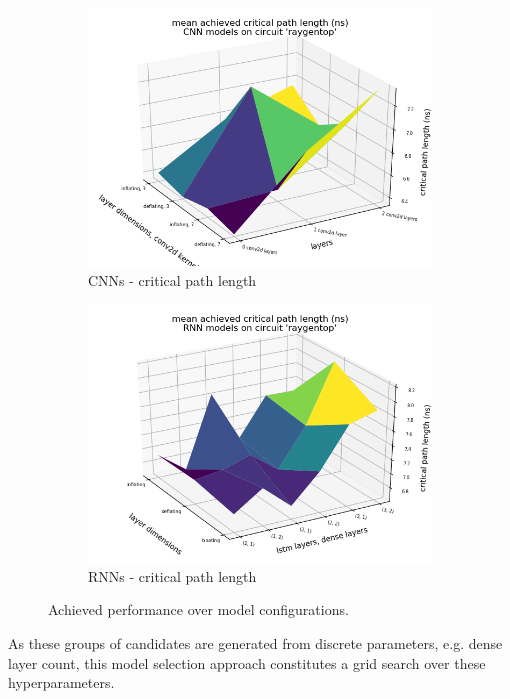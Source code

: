 \begin{figure}
\begin{subfigure}[b]{0.45\linewidth}
		\includegraphics[width=\linewidth]{plots/cnn-hyperopt-critical-path.png}
		\caption{\glspl{CNN} - critical path length}
	\end{subfigure}
	\begin{subfigure}[b]{0.45\linewidth}
		\includegraphics[width=\linewidth]{plots/rnn-hyperopt-critical-path.png}
		\caption{\glspl{RNN} - critical path length}
	\end{subfigure}
	\caption{Achieved performance over model configurations.}
	\label{fig:eval-hyperopt-surface}
\end{figure}

As these groups of candidates are generated from discrete parameters, e.g. dense layer count, this model selection approach constitutes a grid search over these hyperparameters.

